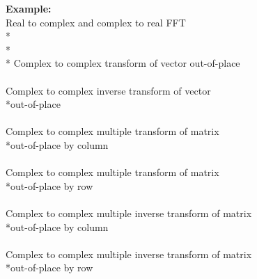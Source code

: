 {\hspace*{1.1cm}\textbf{Example: }\\
\hspace*{2.9cm}Real to complex and complex to real FFT\\*
\hspace*{3.5cm}\\*
\hspace*{3.5cm}\\*
\hspace*{2.9cm}Complex to complex transform of vector  out-of-place\\
\hspace*{3.5cm}\\
 \hspace*{2.9cm}Complex to complex inverse transform of vector \\*\hspace*{2.9cm}out-of-place\\
\hspace*{3.5cm}\\
 \hspace*{2.9cm}Complex to complex multiple transform of matrix \\*\hspace*{2.9cm}out-of-place by column\\
\hspace*{3.5cm}\\
 \hspace*{2.9cm}Complex to complex multiple transform of matrix \\*\hspace*{2.9cm}out-of-place by row\\
\hspace*{3.5cm}\\
 \hspace*{2.9cm}Complex to complex multiple inverse transform of matrix \\*\hspace*{2.9cm}out-of-place by column\\
\hspace*{3.5cm}\\
 \hspace*{2.9cm}Complex to complex multiple inverse transform of matrix \\*\hspace*{2.9cm}out-of-place by row\\
}
